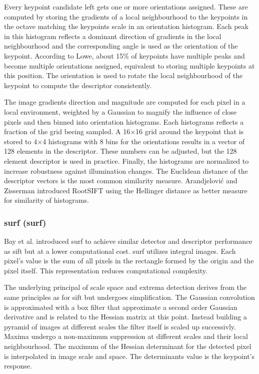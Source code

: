 Every keypoint candidate left gets one or more orientations assigned.
These are computed by storing the gradients of a local neighbourhood to the keypoints in the octave matching the keypoints scale in an orientation histogram.
Each peak in this histogram reflects a dominant direction of gradients in the local neighbourhood and the corresponding angle is used as the orientation of the keypoint.
According to Lowe\cite{lowe_ijcv04}, about 15\% of keypoints have multiple peaks and become multiple orientations assigned, equivalent to storing multiple keypoints at this position.
The orientation is used to rotate the local neighbourhood of the keypoint to compute the descriptor consistently.

The image gradients direction and magnitude are computed for each pixel in a local environment, weighted by a Gaussian to magnify the influence of close pixels and then binned into orientation histograms.
Each histograms reflects a fraction of the grid beeing sampled.
A 16$\times$16 grid around the keypoint that is stored to 4$\times$4 histograms with 8 bins for the orientations results in a vector of 128 elements in the descriptor.
These numbers can be adjusted, but the 128 element descriptor is used in practice.
Finally, the histograms are normalized to increase robustness against illumination changes.
The Euclidean distance of the descriptor vectors is the most common similarity measure.
Arandjelović and Zisserman\cite{arandjelovic_2012} introduced RootSIFT using the Hellinger distance\cite{hellinger_1909} as better measure for similarity of histograms.

\subsubsection{\acrshort{surf} (\acrlong{surf})}

Bay et al. introduced \acrshort{surf}\cite{bay_eccv06} to achieve similar detector and descriptor performance as \acrshort{sift} but at a lower computational cost.
\acrshort{surf} utilizes integral images\cite{viola_cvpr01}.
Each pixel's value is the sum of all pixels in the rectangle formed by the origin and the pixel itself.
This representation reduces computational complexity.

The underlying principal of scale space and extrema detection derives from the same principles as for \acrshort{sift} but undergoes simplification.
The Gaussian convolution is approximated with a box filter that approximate a second order Gaussian derivative and is related to the Hessian matrix at this point.
Instead building a pyramid of images at different scales the filter itself is scaled up successivly.
Maxima undergo a non-maximum suppression at different scales and their local neighbourhood.
The maximum of the Hessian determinant for the detected pixel is interpolated in image scale and space.
The determinants value is the keypoint's response.

